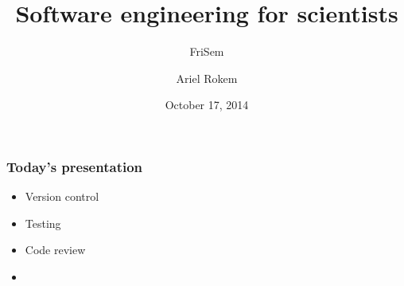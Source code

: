 \documentclass{beamer}
\title[Software engineering for scientists]{Software engineering for scientists}
\subtitle{FriSem}
\author[Ariel Rokem] %
{Ariel Rokem}
\date{October 17, 2014}
\institute[Stanford University]
{Stanford University}
\begin{document}
\begin{frame}
  \titlepage
  \hfill

\end{frame}


\begin{frame}
\frametitle{Today's presentation}
\begin{itemize}
\item
Version control
\item
Testing
\item
Code review 
\item
\end{itemize}
\end{frame}
\end{document}
